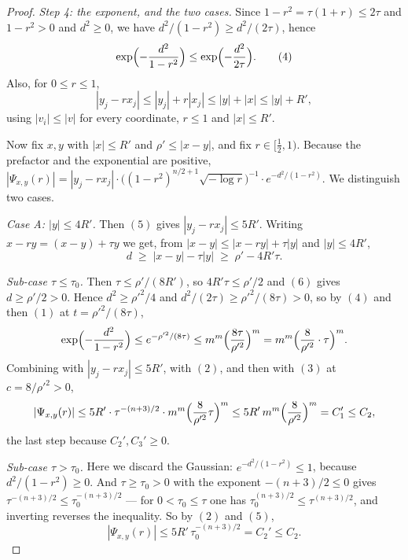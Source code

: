 \begin{proof}
\emph{Step 4: the exponent, and the two cases.}
Since $1-r^2 = \tau(1+r) \leq 2\tau$ and $1-r^2 > 0$ and $d^2 \geq 0$, we have
$d^2/(1-r^2) \geq d^2/(2\tau)$, hence
\begin{equation*}
  \exp\Bigl(-\frac{d^2}{1-r^2}\Bigr)
    \leq \exp\Bigl(-\frac{d^2}{2\tau}\Bigr) . \tag{4}
\end{equation*}
Also, for $0 \leq r \leq 1$,
\begin{equation*}
  |y_j - rx_j| \leq |y_j| + r|x_j| \leq |y| + |x| \leq |y| + R' , \tag{5}
\end{equation*}
using $|v_i| \leq |v|$ for every coordinate, $r \leq 1$ and $|x| \leq R'$.

Now fix $x,y$ with $|x| \leq R'$ and $\rho' \leq |x-y|$, and fix
$r \in [\tfrac12,1)$.  Because the prefactor and the exponential are positive,
$|\Psi_{x,y}(r)| = |y_j-rx_j|\cdot\bigl((1-r^2)^{n/2+1}\sqrt{-\log r}\bigr)^{-1}
 \cdot e^{-d^2/(1-r^2)}$.  We distinguish two cases.

\emph{Case A: $|y| \leq 4R'$.}  Then $(5)$ gives $|y_j-rx_j| \leq 5R'$.  Writing
$x-ry = (x-y) + \tau y$ we get, from $|x-y| \leq |x-ry| + \tau|y|$ and
$|y| \leq 4R'$,
\begin{equation*}
  d \;\geq\; |x-y| - \tau|y| \;\geq\; \rho' - 4R'\tau . \tag{6}
\end{equation*}

\emph{Sub-case $\tau \leq \tau_0$.}  Then $\tau \leq \rho'/(8R')$, so
$4R'\tau \leq \rho'/2$ and $(6)$ gives $d \geq \rho'/2 > 0$.  Hence
$d^2 \geq \rho'^2/4$ and $d^2/(2\tau) \geq \rho'^2/(8\tau) > 0$, so by $(4)$ and
then $(1)$ at $t = \rho'^2/(8\tau)$,
\[
  \exp\Bigl(-\frac{d^2}{1-r^2}\Bigr) \leq e^{-\rho'^2/(8\tau)}
    \leq m^m\Bigl(\frac{8\tau}{\rho'^2}\Bigr)^{m}
    = m^m\Bigl(\frac{8}{\rho'^2}\cdot\tau\Bigr)^{m} .
\]
Combining with $|y_j-rx_j| \leq 5R'$, with $(2)$, and then with $(3)$ at
$c = 8/\rho'^2 > 0$,
\[
  |\Psi_{x,y}(r)|
    \leq 5R'\cdot\tau^{-(n+3)/2}\cdot m^m\Bigl(\frac{8}{\rho'^2}\tau\Bigr)^{m}
    \leq 5R'\,m^m\Bigl(\frac{8}{\rho'^2}\Bigr)^{m} = C_1' \leq C_2 ,
\]
the last step because $C_2', C_3' \geq 0$.

\emph{Sub-case $\tau > \tau_0$.}  Here we discard the Gaussian:
$e^{-d^2/(1-r^2)} \leq 1$, because $d^2/(1-r^2) \geq 0$.  And $\tau \geq \tau_0 > 0$
with the exponent $-(n+3)/2 \leq 0$ gives
$\tau^{-(n+3)/2} \leq \tau_0^{-(n+3)/2}$ --- for $0 < \tau_0 \leq \tau$ one has
$\tau_0^{(n+3)/2} \leq \tau^{(n+3)/2}$, and inverting reverses the inequality.  So
by $(2)$ and $(5)$,
\[
  |\Psi_{x,y}(r)| \leq 5R'\,\tau_0^{-(n+3)/2} = C_2' \leq C_2 .
\]


\end{proof}
